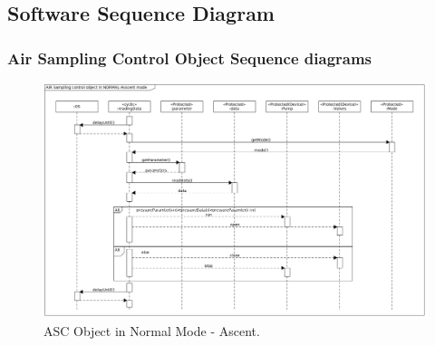 \begin{landscape}
\subsection{Software Sequence Diagram} \label{sec:appB}

\subsubsection{Air Sampling Control Object Sequence diagrams}
\begin{figure}[H]
    \centering
    \includegraphics[height=0.75\textwidth]{appendix/img/ASC-seq-dia-v1-2-a.png}
    \caption{ASC Object in Normal Mode - Ascent.}
    \label{ASCa}
\end{figure}


\end{landscape}
